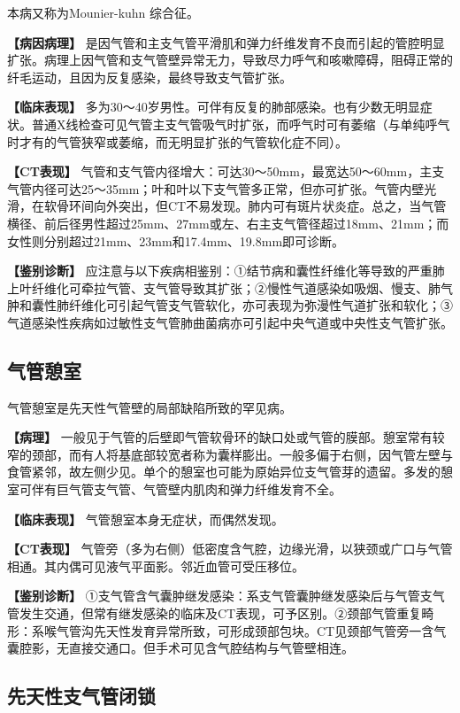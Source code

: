 本病又称为Mounier-kuhn 综合征。

\textbf{【病因病理】}
是因气管和主支气管平滑肌和弹力纤维发育不良而引起的管腔明显扩张。病理上因气管和支气管壁异常无力，导致尽力呼气和咳嗽障碍，阻碍正常的纤毛运动，且因为反复感染，最终导致支气管扩张。

\textbf{【临床表现】}
多为30～40岁男性。可伴有反复的肺部感染。也有少数无明显症状。普通X线检查可见气管主支气管吸气时扩张，而呼气时可有萎缩（与单纯呼气时才有的气管狭窄或萎缩，而无明显扩张的气管软化症不同）。

\textbf{【CT表现】}
气管和支气管内径增大：可达30～50mm，最宽达50～60mm，主支气管内径可达25～35mm；叶和叶以下支气管多正常，但亦可扩张。气管内壁光滑，在软骨环间向外突出，但CT不易发现。肺内可有斑片状炎症。总之，当气管横径、前后径男性超过25mm、27mm或左、右主支气管径超过18mm、21mm；而女性则分别超过21mm、23mm和17.4mm、19.8mm即可诊断。

\textbf{【鉴别诊断】}
应注意与以下疾病相鉴别：①结节病和囊性纤维化等导致的严重肺上叶纤维化可牵拉气管、支气管导致其扩张；②慢性气道感染如吸烟、慢支、肺气肿和囊性肺纤维化可引起气管支气管软化，亦可表现为弥漫性气道扩张和软化；③气道感染性疾病如过敏性支气管肺曲菌病亦可引起中央气道或中央性支气管扩张。

\subsection{气管憩室}

气管憩室是先天性气管壁的局部缺陷所致的罕见病。

\textbf{【病理】}
一般见于气管的后壁即气管软骨环的缺口处或气管的膜部。憩室常有较窄的颈部，而有人将基底部较宽者称为囊样膨出。一般多偏于右侧，因气管左壁与食管紧邻，故左侧少见。单个的憩室也可能为原始异位支气管芽的遗留。多发的憩室可伴有巨气管支气管、气管壁内肌肉和弹力纤维发育不全。

\textbf{【临床表现】} 气管憩室本身无症状，而偶然发现。

\textbf{【CT表现】}
气管旁（多为右侧）低密度含气腔，边缘光滑，以狭颈或广口与气管相通。其内偶可见液气平面影。邻近血管可受压移位。

\textbf{【鉴别诊断】}
①支气管含气囊肿继发感染：系支气管囊肿继发感染后与气管支气管发生交通，但常有继发感染的临床及CT表现，可予区别。②颈部气管重复畸形：系喉气管沟先天性发育异常所致，可形成颈部包块。CT见颈部气管旁一含气囊腔影，无直接交通口。但手术可见含气腔结构与气管壁相连。

\subsection{先天性支气管闭锁}


